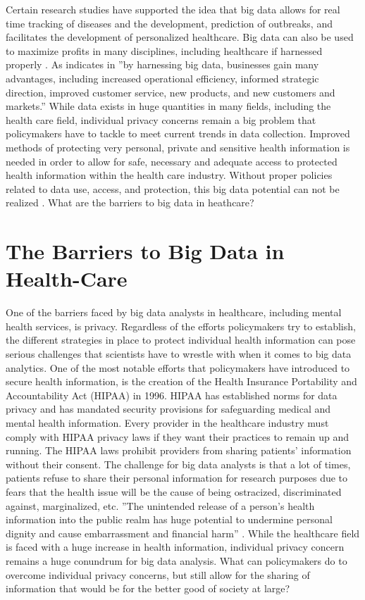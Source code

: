 \documentclass[sigconf]{acmart}
\begin{document}
Certain research studies have supported the idea that big data allows for real time tracking of diseases and the development, prediction of outbreaks, and facilitates the development of personalized healthcare. Big data can also be used to maximize profits in many disciplines, including healthcare if harnessed properly \cite{van2011health}. As indicates in \cite{khan2014big} ''by harnessing big data, businesses gain many advantages, including increased operational efficiency, informed strategic direction, improved customer service, new products, and new customers and markets.'' While data exists in huge quantities in many fields, including the health care field, individual privacy concerns remain a big problem that policymakers have to tackle to meet current trends in data collection. Improved methods of protecting very personal, private and sensitive health information is needed in order to allow for safe, necessary and adequate access to protected health information within the health care industry. Without proper policies related to data use, access, and protection, this big data potential can not be realized \cite{roski2014creating}. What are the barriers to big data in heathcare? 

\section{The Barriers to Big Data in Health-Care}

One of the barriers faced by big data analysts in healthcare, including mental health services, is privacy. Regardless of the efforts policymakers try to establish, the different strategies in place to protect individual health information can pose serious challenges that scientists have to wrestle with when it comes to big data analytics. One of the most notable efforts that policymakers have introduced to secure health information, is the creation of the Health Insurance Portability and Accountability Act (HIPAA) in 1996. HIPAA has established norms for data privacy and has mandated security provisions for safeguarding medical and mental health information. Every provider in the healthcare industry must comply with HIPAA privacy laws if they want their practices to remain up and running. The HIPAA laws prohibit providers from sharing patients' information without their consent. The challenge for big data analysts is that a lot of times, patients refuse to share their personal information for research purposes due to fears that the health issue will be the cause of being ostracized, discriminated against, marginalized, etc. ''The unintended release of a person's health information into the public realm has huge potential to undermine personal dignity and cause embarrassment and financial harm'' \cite{van2011health}. While the healthcare field is faced with a huge increase in health information, individual privacy concern remains a huge conundrum for big data analysis. What can policymakers do to overcome individual privacy concerns, but still allow for the sharing of information that would be for the better good of society at large?
\end{document}
